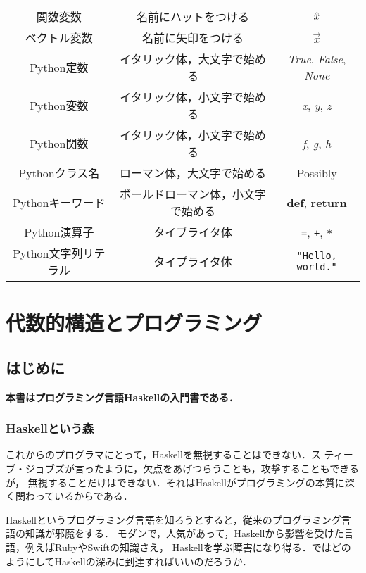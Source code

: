 \documentclass[twocolumn]{jsbook}
\newcommand{\programminglanguage}[1]{\textsf{#1}}
\newcommand{\haskell}{\programminglanguage{Haskell}}
\newcommand{\python}{\programminglanguage{Python}}
\newcommand{\ruby}{\programminglanguage{Ruby}}
\newcommand{\swift}{\programminglanguage{Swift}}
\newenvironment{leader}{\begingroup\bf}{\endgroup}
\newcommand{\pthnId}[1]{\textit{#1}}
\newcommand{\pthnKeyword}[1]{\textbf{#1}}
\newcommand{\pthnOp}[1]{\texttt{#1}}
\newcommand{\pthnString}[1]{\texttt{#1}}
\newcommand{\hsklFunction}[1]{\Hat{#1}}
\newcommand{\mathVector}[1]{\vec{#1}}
\begin{document}
\begin{table*}
\begin{center}
\begin{tabular}{||c|c|c||}
関数変数&名前にハットをつける&$\hsklFunction{x}$\\
ベクトル変数&名前に矢印をつける&$\mathVector{x}$\\
\hline
\python 定数&イタリック体，大文字で始める&\pthnId{True}, \pthnId{False}, \pthnId{None}\\
\python 変数&イタリック体，小文字で始める&\pthnId{x}, \pthnId{y}, \pthnId{z}\\
\python 関数&イタリック体，小文字で始める&\pthnId{f}, \pthnId{g}, \pthnId{h}\\
\python クラス名&ローマン体，大文字で始める&Possibly\\
\python キーワード&ボールドローマン体，小文字で始める&\pthnKeyword{def}, \pthnKeyword{return}\\
\python 演算子&タイプライタ体&\pthnOp{=}, \pthnOp{+}, \pthnOp{*}\\
\python 文字列リテラル&タイプライタ体&\pthnString{"Hello, world."}\\
\hline
\end{tabular}
\end{center}
\end{table*}

\part{代数的構造とプログラミング}

\chapter{はじめに}

\begin{leader}
本書はプログラミング言語\haskell の入門書である．
\end{leader}

\section{\haskell という森}

これからのプログラマにとって，\haskell を無視することはできない．ス
ティーブ・ジョブズが言ったように，欠点をあげつらうことも，攻撃することもできるが，
無視することだけはできない．それは\haskell がプログラミングの本質に深く関わっているからである．

\haskell というプログラミング言語を知ろうとすると，従来のプログラミング言語の知識が邪魔をする．
モダンで，人気があって，\haskell から影響を受けた言語，例えば\ruby や\swift の知識さえ，
\haskell を学ぶ障害になり得る．ではどのようにして\haskell の深みに到達すればいいのだろうか．
\end{document}
